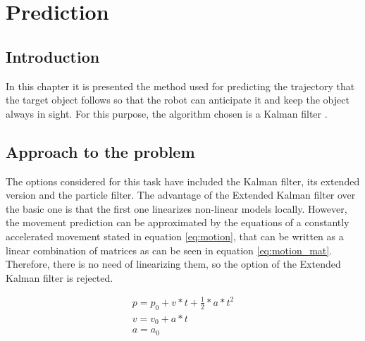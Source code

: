 
\chapter{Prediction} %
\label{chap:prediction}
\section{Introduction}
In this chapter it is presented the method used for predicting the trajectory that the target object follows so that the robot can anticipate it and keep the object always in sight.
For this purpose, the algorithm chosen is a Kalman filter \cite{kalman}.

\section{Approach to the problem}
The options considered for this task have included the Kalman filter, its extended version and the particle filter. The advantage of the Extended Kalman filter over the basic one is that the first one linearizes non-linear models locally. However, the movement prediction can be approximated by the equations of a constantly accelerated movement stated in equation \ref{eq:motion}, that can be written as a linear combination of matrices as can be seen in equation \ref{eq:motion_mat}. Therefore, there is no need of linearizing them, so the option of the Extended Kalman filter is rejected.

\begin{equation}
\begin{multlined}
p=p_{0}+v*t+\frac{1}{2}*a*t^{2} \\
v=v_{0}+a*t \\
a=a_{0} \\
\end{multlined}
\label{eq:motion}
\end{equation}

